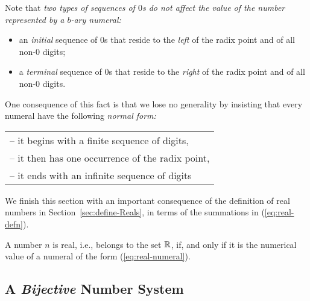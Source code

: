 Note that {\em two types of sequences of $0$s do not affect the value of the number represented by a $b$-ary numeral:}
\begin{itemize}
\item
an {\em initial} sequence of $0$s that reside to the {\em left} of the radix point and of all non-$0$ digits;
\item
a {\em terminal} sequence of $0$s that reside to the {\em right} of the radix point and of all non-$0$ digits.
\end{itemize}
One consequence of this fact is that we lose no generality by insisting that every numeral have the following {\em normal form:}

\smallskip

\hspace*{.15in}
\begin{tabular}{l}
-- it begins with a finite sequence of digits, \\
-- it then has one occurrence of the radix point, \\
-- it ends with an infinite sequence of digits
\end{tabular}

\bigskip

We finish this section with an important consequence of the definition of real numbers in Section~\ref{sec:define-Reals}, in terms of the summations in (\ref{eq:real-defn}).

\begin{prop}
\label{thm:define-Reals-via-numerals}
A number $n$ is real, i.e., belongs to the set $\mathbb{R}$, if, and only if it is the numerical value of a numeral of the form (\ref{eq:real-numeral}).
\end{prop}

\subsection{A {\em Bijective} Number System}
\label{sec:bijective-adic}

